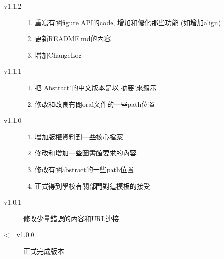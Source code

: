 \begin{description}
  \item[v1.1.2] \hfill
    \begin{enumerate}
      \item 重寫有關figure API的code, 增加和優化那些功能 (如增加align)
      \item 更新README.md的內容
      \item 增加ChangeLog
    \end{enumerate}

  \item[v1.1.1] \hfill
    \begin{enumerate}
      \item 把'Abstract'的中文版本是以'摘要'來顯示
      \item 修改和改良有關oral文件的一些path位置
    \end{enumerate}

  \item[v1.1.0] \hfill
    \begin{enumerate}
      \item 增加版權資料到一些核心檔案
      \item 修改和增加一些圖書館要求的內容
      \item 修改有關abstract的一些path位置
      \item 正式得到學校有關部門對這模板的接受
    \end{enumerate}

  \item[v1.0.1] 修改少量錯誤的內容和URL連接

  \item[<= v1.0.0] 正式完成版本
\end{description}

